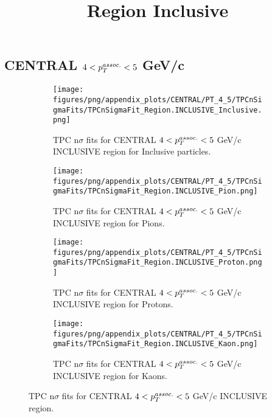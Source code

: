     
            \subsection{CENTRAL $4 < \pTassoc < 5$ GeV/c}
            \begin{figure}[H]
                \title{Region Inclusive}
                \begin{subfigure}[b]{0.5\textwidth}
                    \centering
                    \texttt{[image: figures/png/appendix\_plots/CENTRAL/PT\_4\_5/TPCnSigmaFits/TPCnSigmaFit\_Region.INCLUSIVE\_Inclusive.png]}
                    \caption{TPC n$\sigma$ fits for CENTRAL $4 < \pTassoc < 5$ GeV/c INCLUSIVE region for Inclusive particles.}
                    \label{fig:appendix_CENTRAL_$4 < \pTassoc < 5$ GeV/c_INCLUSIVE_Inclusive}
                \end{subfigure}
                \begin{subfigure}[b]{0.5\textwidth}
                    \centering
                    \texttt{[image: figures/png/appendix\_plots/CENTRAL/PT\_4\_5/TPCnSigmaFits/TPCnSigmaFit\_Region.INCLUSIVE\_Pion.png]}
                    \caption{TPC n$\sigma$ fits for CENTRAL $4 < \pTassoc < 5$ GeV/c INCLUSIVE region for Pions.}
                    \label{fig:appendix_CENTRAL_$4 < \pTassoc < 5$ GeV/c_INCLUSIVE_Pion}
                \end{subfigure}
                \begin{subfigure}[b]{0.5\textwidth}
                    \centering
                    \texttt{[image: figures/png/appendix\_plots/CENTRAL/PT\_4\_5/TPCnSigmaFits/TPCnSigmaFit\_Region.INCLUSIVE\_Proton.png]}
                    \caption{TPC n$\sigma$ fits for CENTRAL $4 < \pTassoc < 5$ GeV/c INCLUSIVE region for Protons.}
                    \label{fig:appendix_CENTRAL_$4 < \pTassoc < 5$ GeV/c_INCLUSIVE_Proton}
                \end{subfigure}
                \begin{subfigure}[b]{0.5\textwidth}
                    \centering
                    \texttt{[image: figures/png/appendix\_plots/CENTRAL/PT\_4\_5/TPCnSigmaFits/TPCnSigmaFit\_Region.INCLUSIVE\_Kaon.png]}
                    \caption{TPC n$\sigma$ fits for CENTRAL $4 < \pTassoc < 5$ GeV/c INCLUSIVE region for Kaons.}
                    \label{fig:appendix_CENTRAL_$4 < \pTassoc < 5$ GeV/c_INCLUSIVE_Kaon}
                \end{subfigure}
                \caption{TPC n$\sigma$ fits for CENTRAL $4 < \pTassoc < 5$ GeV/c INCLUSIVE region.}
                \label{fig:appendix_CENTRAL_$4 < \pTassoc < 5$ GeV/c_INCLUSIVE}
            \end{figure}
